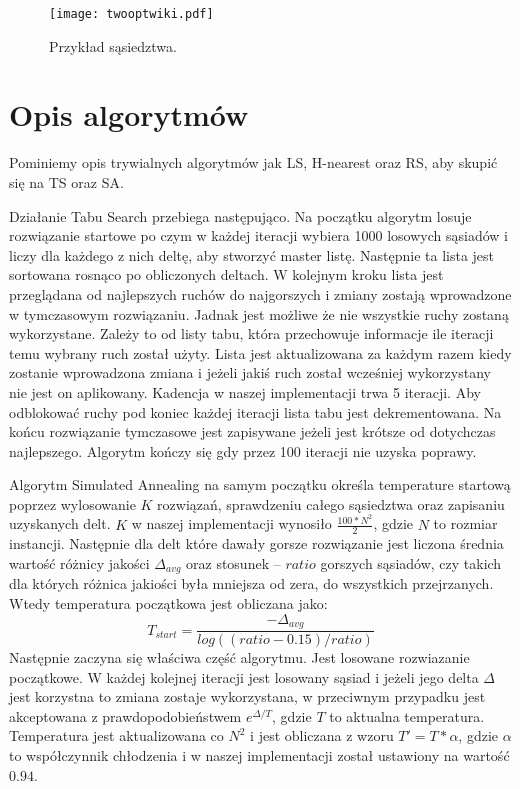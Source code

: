 \documentclass{article}
\begin{document}
\begin{figure} 
\begin{center}
\texttt{[image: twooptwiki.pdf]}
\end{center}
\caption{Przykład sąsiedztwa.}
\label{fig:schemat2}
\end{figure}


\section{Opis algorytmów}

Pominiemy opis trywialnych algorytmów jak LS, H-nearest oraz RS, aby skupić się na TS oraz SA.

Działanie Tabu Search przebiega następująco. Na początku algorytm losuje rozwiązanie startowe po czym w każdej iteracji wybiera 1000 losowych sąsiadów i liczy dla każdego z nich deltę, aby stworzyć master listę. Następnie ta lista jest sortowana rosnąco po obliczonych deltach. W kolejnym kroku lista jest przeglądana od najlepszych ruchów do najgorszych i zmiany zostają wprowadzone w tymczasowym rozwiązaniu. Jadnak jest możliwe że nie wszystkie ruchy zostaną wykorzystane. Zależy to od listy tabu, która przechowuje informacje ile iteracji temu wybrany ruch został użyty. Lista jest aktualizowana za każdym razem kiedy zostanie wprowadzona zmiana i jeżeli jakiś ruch został wcześniej wykorzystany nie jest on aplikowany. Kadencja w naszej implementacji trwa 5 iteracji. Aby odblokować ruchy pod koniec każdej iteracji lista tabu jest dekrementowana. Na końcu rozwiązanie tymczasowe jest zapisywane jeżeli jest krótsze od dotychczas najlepszego. Algorytm kończy się gdy przez 100 iteracji nie uzyska poprawy.


Algorytm Simulated Annealing na samym początku określa temperature startową poprzez wylosowanie $K$ rozwiązań, sprawdzeniu całego sąsiedztwa oraz zapisaniu uzyskanych delt. $K$ w naszej implementacji wynosiło $\frac{100 * N^2}{2}$, gdzie $N$ to rozmiar instancji. Następnie dla delt które dawały gorsze rozwiązanie jest liczona średnia wartość różnicy jakości $\Delta_{avg}$ oraz stosunek -- $ratio$ gorszych sąsiadów, czy takich dla których różnica jakiości była mniejsza od zera, do wszystkich przejrzanych. Wtedy temperatura początkowa jest obliczana jako:
$$
T_{start} = \frac{-\Delta_{avg}}{log((ratio - 0.15) / ratio)}
$$
Następnie zaczyna się właściwa część algorytmu. Jest losowane rozwiazanie początkowe. W każdej kolejnej iteracji jest losowany sąsiad i jeżeli jego delta $\Delta$ jest korzystna to zmiana zostaje wykorzystana, w przeciwnym przypadku jest akceptowana z prawdopodobieństwem $e^{\Delta/T}$, gdzie $T$ to aktualna temperatura. Temperatura jest aktualizowana co $N^2$ i jest obliczana z wzoru $T'=T*\alpha$, gdzie $\alpha$ to współczynnik chłodzenia i w naszej implementacji został ustawiony na wartość $0.94$.
\end{document}
